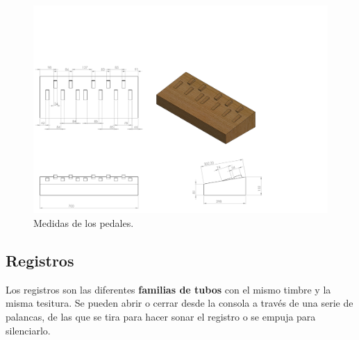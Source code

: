 \smallskip

\begin{figure}[H]
	\noindent \begin{centering}
		\includegraphics[width=\linewidth*3/4]{capitulo3/pedalier_modelo}
		\par\end{centering}
	\smallskip
	\caption{\label{fig:pedalier_modelo} Medidas de los pedales.}
\end{figure} 

\smallskip

\subsection{Registros}

Los registros son las diferentes \textbf{familias de tubos} con el mismo timbre y la misma tesitura. Se pueden abrir o cerrar desde la consola a través de una serie de palancas, de las que se tira para hacer sonar el registro o se empuja para silenciarlo.

\smallskip

